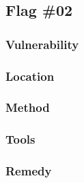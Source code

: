 \subsection{Flag \#02}

\begin{center}
\end{center}

\subsubsection{Vulnerability}

\subsubsection{Location}

\subsubsection{Method}

\subsubsection{Tools}

\subsubsection{Remedy}